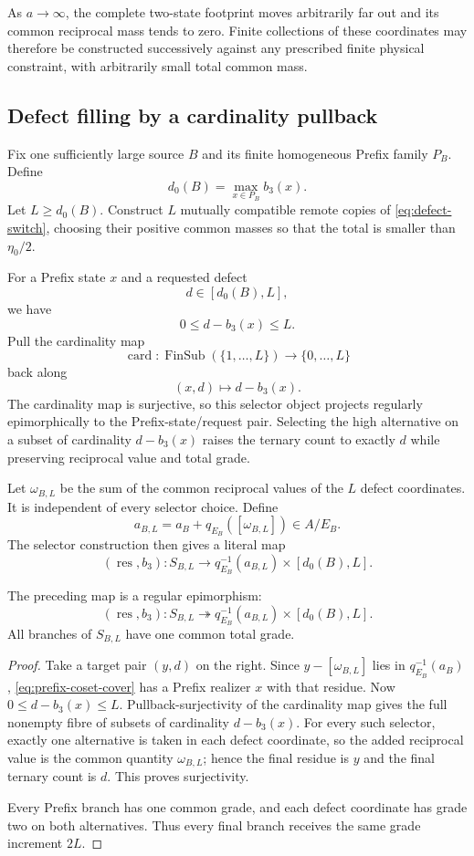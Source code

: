 As $a\to\infty$, the complete two-state footprint moves arbitrarily far out
and its common reciprocal mass tends to zero.  Finite collections of these
coordinates may therefore be constructed successively against any prescribed
finite physical constraint, with arbitrarily small total common mass.

\subsection{Defect filling by a cardinality pullback}

Fix one sufficiently large source $B$ and its finite homogeneous Prefix family
$P_B$.  Define
\[
d_0(B)=\max_{x\in P_B}b_3(x).
\tag{A2}\label{eq:defect-floor}
\]
Let $L\ge d_0(B)$.  Construct $L$ mutually compatible remote copies of
\eqref{eq:defect-switch}, choosing their positive common masses so that the
total is smaller than $\eta_0/2$.

For a Prefix state $x$ and a requested defect
\[
d\in[d_0(B),L],
\]
we have
\[
0\le d-b_3(x)\le L.
\]
Pull the cardinality map
\[
\operatorname{card}:
\operatorname{FinSub}(\{1,\ldots,L\})
\longrightarrow
\{0,\ldots,L\}
\]
back along
\[
(x,d)\longmapsto d-b_3(x).
\]
The cardinality map is surjective, so this selector object projects regularly
epimorphically to the Prefix-state/request pair.  Selecting the high
alternative on a subset of cardinality $d-b_3(x)$ raises the ternary count to
exactly $d$ while preserving reciprocal value and total grade.

Let $\omega_{B,L}$ be the sum of the common reciprocal values of the $L$
defect coordinates.  It is independent of every selector choice.  Define
\[
a_{B,L}=a_B+q_{E_B}([\omega_{B,L}])\in A/E_B.
\]
The selector construction then gives a literal map
\[
(\operatorname{res},b_3):
S_{B,L}\longrightarrow
q_{E_B}^{-1}(a_{B,L})\times[d_0(B),L].
\]

\begin{lemma}
\label{lem:masterslab-coset}
The preceding map is a regular epimorphism:
\[
(\operatorname{res},b_3):
S_{B,L}\twoheadrightarrow
q_{E_B}^{-1}(a_{B,L})\times[d_0(B),L].
\tag{A3}\label{eq:masterslab-cover}
\]
All branches of $S_{B,L}$ have one common total grade.
\end{lemma}

\begin{proof}
Take a target pair $(y,d)$ on the right.  Since
$y-[\omega_{B,L}]$ lies in $q_{E_B}^{-1}(a_B)$,
\eqref{eq:prefix-coset-cover} has a Prefix realizer $x$ with that residue.
Now $0\le d-b_3(x)\le L$.  Pullback-surjectivity of the cardinality map gives
the full nonempty fibre of subsets of cardinality $d-b_3(x)$.  For every such
selector, exactly one alternative is taken in each defect coordinate, so the
added reciprocal value is the common quantity $\omega_{B,L}$; hence the final
residue is $y$ and the final ternary count is $d$.  This proves surjectivity.

Every Prefix branch has one common grade, and each defect coordinate has grade
two on both alternatives.  Thus every final branch receives the same grade
increment $2L$.
\end{proof}

